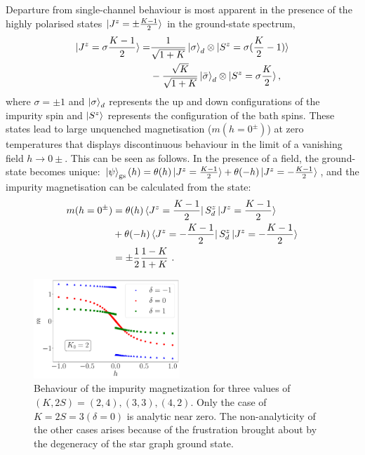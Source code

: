 \documentclass{iopart}
\begin{document}
Departure from single-channel behaviour is most apparent in the presence of the highly polarised states \(\ket{J^z=\pm \frac{K-1}{2}}\) in the ground-state spectrum,
\begin{eqnarray}
	\ket{J^z=\sigma \frac{K-1}{2}} =& \frac{1}{\sqrt{1 + K}} \ket{\sigma}_d\otimes\ket{S^z=\sigma(\frac{K}{2}-1)} \nonumber\\
					&- \frac{\sqrt K}{\sqrt{1 + K}}\ket{\bar\sigma}_d\otimes\ket{S^z=\sigma\frac{K}{2}},
\end{eqnarray}
where \(\sigma=\pm 1\) and \(\ket{\sigma}_d\) represents the up and down configurations of the impurity spin and \(\ket{S^z}\) represents the configuration of the bath spins. These states lead to large unquenched magnetisation (\(m(h=0^\pm)\)) at zero temperatures
that displays discontinuous behaviour in the limit of a vanishing field $h\to 0\pm$. This can be seen as follows. In the presence of a field, the ground-state becomes unique: \(\ket{\psi}_\mathrm{gs}(h) = \theta(h)\ket{J^z=\frac{K-1}{2}} + \theta(-h)\ket{J^z=-\frac{K-1}{2}}\), and the impurity magnetisation can be calculated from the state:
\begin{eqnarray}
	m(h=0^\pm) &= \theta(h)\bra{J^z=\frac{K-1}{2}} S_d^z \ket{J^z=\frac{K-1}{2}} \nonumber\\
		   &+ \theta(-h)\bra{J^z=-\frac{K-1}{2}}S_d^z\ket{J^z=-\frac{K-1}{2}}\nonumber\\
	&= \pm  \frac{1}{2} \frac{1-K}{1 + K}\label{imp-magnetisation}~.
\end{eqnarray}

\begin{figure}[!htpb]
	\centering
	\includegraphics[width=0.49\textwidth]{discmagimpgen.pdf}
	\caption{Behaviour of the impurity magnetization for three values of \(\left(K, 2S\right) = \left(2, 4\right), \left( 3,3 \right), \left(4, 2\right)  \). Only the case of \(K=2S=3 \left(\delta=0\right)\) is analytic near zero. The non-analyticity of the other cases arises because of the frustration brought about by the degeneracy of the star graph ground state.}
	\label{mag_crit}
\end{figure}
\end{document}
